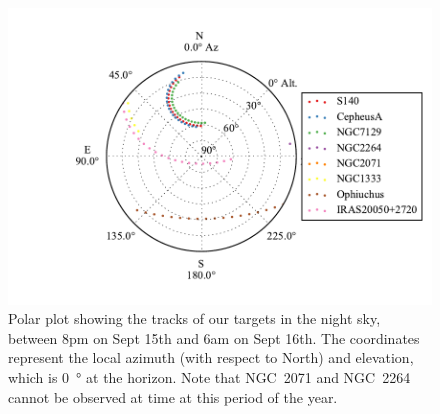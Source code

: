 \begin{figure}[!h]
	\centering
	\includegraphics[width=\textwidth]{Figures/TargetPlot.pdf}
	\caption[Targets]{Polar plot showing the tracks of our targets in the night sky, between 8pm on Sept 15th and 6am on Sept 16th. The coordinates represent the local azimuth (with respect to North) and elevation, which is \SI{0}{\degree} at the horizon. Note that NGC~2071 and NGC~2264 cannot be observed at time at this period of the year.}
	\label{fig:Targets}
    \end{figure}
